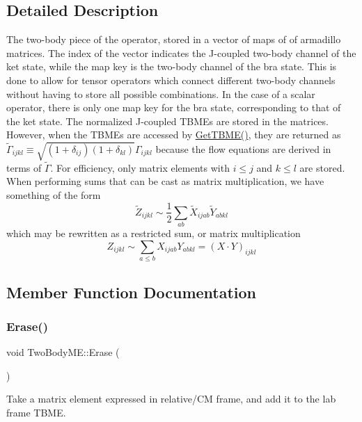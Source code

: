 \subsection{Detailed Description}
The two-\/body piece of the operator, stored in a vector of maps of of armadillo matrices. The index of the vector indicates the J-\/coupled two-\/body channel of the ket state, while the map key is the two-\/body channel of the bra state. This is done to allow for tensor operators which connect different two-\/body channels without having to store all possible combinations. In the case of a scalar operator, there is only one map key for the bra state, corresponding to that of the ket state. The normalized J-\/coupled T\+B\+ME\textquotesingle{}s are stored in the matrices. However, when the T\+B\+ME\textquotesingle{}s are accessed by \hyperlink{classTwoBodyME_a86c81a876ec642f8a28750df4d0c1907}{Get\+T\+B\+M\+E()}, they are returned as $ \tilde{\Gamma}_{ijkl} \equiv \sqrt{(1+\delta_{ij})(1+\delta_{kl})} \Gamma_{ijkl} $ because the flow equations are derived in terms of $ \tilde{\Gamma} $. For efficiency, only matrix elements with $ i\leq j $ and $ k\leq l $ are stored. When performing sums that can be cast as matrix multiplication, we have something of the form \[ \tilde{Z}_{ijkl} \sim \frac{1}{2} \sum_{ab}\tilde{X}_{ijab} \tilde{Y}_{abkl} \] which may be rewritten as a restricted sum, or matrix multiplication \[ Z_{ijkl} \sim \sum_{a\leq b} X_{ijab} Y_{abkl} = \left( X\cdot Y \right)_{ijkl} \] 

\subsection{Member Function Documentation}
\mbox{\label{classTwoBodyME_acd6f31eaef7652136740204ce5c4d226}} 
\subsubsection{\texorpdfstring{Erase()}{Erase()}}
{\footnotesize\ttfamily void Two\+Body\+M\+E\+::\+Erase (\begin{DoxyParamCaption}{ }\end{DoxyParamCaption})}



Take a matrix element expressed in relative/\+CM frame, and add it to the lab frame T\+B\+ME. 


